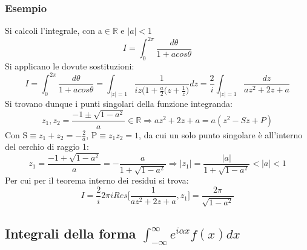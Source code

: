\documentclass[twoside]{article}
\begin{document}
\subsubsection{Esempio}
Si calcoli l'integrale, con a$\in\mathds{R}$ e $|a|<1$
\begin{equation}
    I=\int_0^{2\pi}\frac{d\theta}{1+acos\theta}
\end{equation}
Si applicano le dovute sostituzioni:
\begin{equation}
     I=\int_0^{2\pi}\frac{d\theta}{1+acos\theta}=\int_{|z|=1}\frac{1}{iz(1+\frac{a}{2}\biggl(z+\frac{1}{z}\biggr)}dz=\frac{2}{i}\int_{|z|=1}\frac{dz}{az^2+2z+a}
\end{equation}
Si trovano dunque i punti singolari della funzione integranda:
\begin{equation}
    z_1,z_2=\frac{-1\pm\sqrt{1-a^2}}{a}\in \mathds{R}\Longrightarrow az^2+2z+a=a(z^2-Sz+P)
\end{equation}
Con S$\equiv z_1+z_2=-\frac{2}{a}$, P$\equiv z_1z_2=1$, da cui un solo punto singolare è all'interno del cerchio di raggio 1:
\begin{equation}
z_1=\frac{-1+\sqrt{1-a^2}}{a}=-\frac{a}{1+\sqrt{1-a^2}} \Longrightarrow |z_1|=\frac{|a|}{1+\sqrt{1-a^2}}<|a|<1
\end{equation}
Per cui per il teorema interno dei residui si trova:
\begin{equation}
    I=\frac{2}{i}2\pi iRes\biggl[\frac{1}{az^2+2z+a},z_1\biggr]=\frac{2\pi}{\sqrt{1-a^2}}
\end{equation}

\subsection{Integrali della forma \texorpdfstring{$\int_{-\infty}^{\infty}e^{i\alpha x}f(x) dx$}{Lg}}
\end{document}
